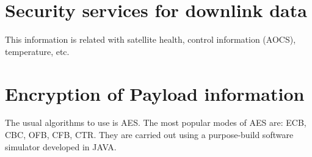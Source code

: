 \documentclass[12pt,a4paper]{report}
\begin{document}
\section{Security services for downlink data}
This information is related with satellite health, control information (AOCS), temperature, etc.
\section{Encryption of Payload information}
The usual algorithms to use is AES. The most popular modes of AES are: ECB, CBC, OFB, CFB, CTR. They are carried out using a purpose-build software simulator developed in JAVA. 
\end{document}
